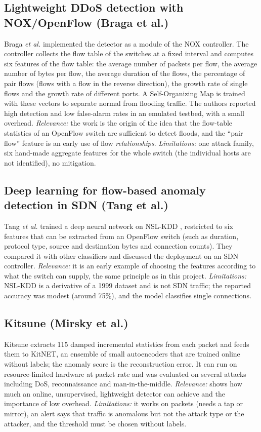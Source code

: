 \subsection{Lightweight DDoS detection with NOX/OpenFlow (Braga et al.)}
Braga \emph{et al.} \cite{bib:braga} implemented the detector as a module of the NOX controller. The controller collects the flow table of the switches at a fixed interval and computes six features of the flow table: the average number of packets per flow, the average number of bytes per flow, the average duration of the flows, the percentage of pair flows (flows with a flow in the reverse direction), the growth rate of single flows and the growth rate of different ports. A Self-Organizing Map is trained with these vectors to separate normal from flooding traffic. The authors reported high detection and low false-alarm rates in an emulated testbed, with a small overhead. \emph{Relevance:} the work is the origin of the idea that the flow-table statistics of an OpenFlow switch are sufficient to detect floods, and the ``pair flow'' feature is an early use of flow \emph{relationships}. \emph{Limitations:} one attack family, six hand-made aggregate features for the whole switch (the individual hosts are not identified), no mitigation.

\subsection{Deep learning for flow-based anomaly detection in SDN (Tang et al.)}
Tang \emph{et al.} \cite{bib:tang} trained a deep neural network on NSL-KDD \cite{bib:nslkdd}, restricted to six features that can be extracted from an OpenFlow switch (such as duration, protocol type, source and destination bytes and connection counts). They compared it with other classifiers and discussed the deployment on an SDN controller. \emph{Relevance:} it is an early example of choosing the features according to what the switch can supply, the same principle as in this project. \emph{Limitations:} NSL-KDD is a derivative of a 1999 dataset and is not SDN traffic; the reported accuracy was modest (around 75\%), and the model classifies single connections.

\subsection{Kitsune (Mirsky et al.)}
Kitsune \cite{bib:kitsune} extracts 115 damped incremental statistics from each packet and feeds them to KitNET, an ensemble of small autoencoders that are trained online without labels; the anomaly score is the reconstruction error. It can run on resource-limited hardware at packet rate and was evaluated on several attacks including DoS, reconnaissance and man-in-the-middle. \emph{Relevance:} shows how much an online, unsupervised, lightweight detector can achieve and the importance of low overhead. \emph{Limitations:} it works on packets (needs a tap or mirror), an alert says that traffic is anomalous but not the attack type or the attacker, and the threshold must be chosen without labels.

